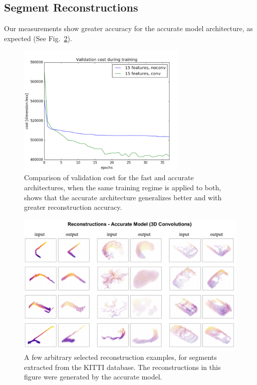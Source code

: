 \subsection{Segment Reconstructions}

Our measurements show greater accuracy for the accurate model architecture, as expected (See Fig.~\ref{fig:trainingcost}).\\

\begin{figure}
  \centering
  \includegraphics[width=3.2in]{images/trainingcost.png}
  \caption{Comparison of validation cost for the fast and accurate architectures, when the same training regime is applied to both, shows that the accurate architecture generalizes better and with greater reconstruction accuracy.}
  \label{fig:trainingcost}
\end{figure}

\begin{figure}
  \centering
  \includegraphics[width=5.2in]{images/convreconstructions.pdf}
  \caption{A few arbitrary selected reconstruction examples, for segments extracted from the KITTI database. The reconstructions in this figure were generated by the accurate model.}
  \label{fig:trainingcost}
\end{figure}

